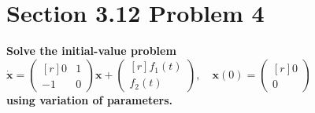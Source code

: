 \documentclass[11pt]{article}
\begin{document}
 \newpage

 \section*{Section 3.12 Problem 4}
 \textbf{Solve the initial-value problem \quad\quad
 $\boldsymbol{\dot x} = \begin{pmatrix*}[r] 0 & 1 \\ -1 & 0 \end{pmatrix*}\boldsymbol{x} + 
   \begin{pmatrix*}[r] f_1(t) \\ f_2(t) \end{pmatrix*}, \quad 
     \boldsymbol{x}(0) = \begin{pmatrix*}[r] 0 \\ 0 \end{pmatrix*}$ \\
   using variation of parameters.}

 \newpage
\end{document}
